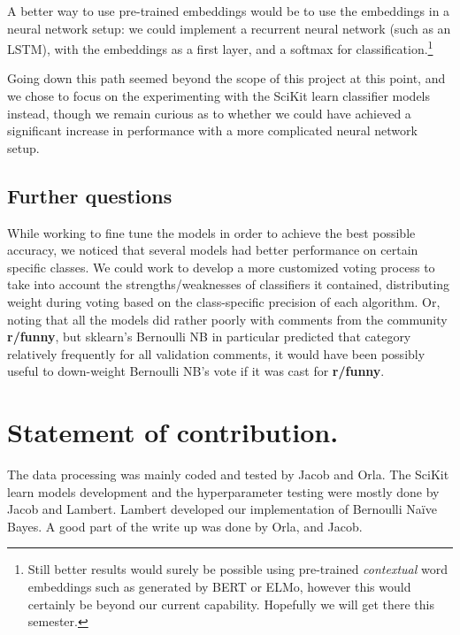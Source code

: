 \documentclass[letterpaper, 11pt]{article}
\begin{document}
A better way to use pre-trained embeddings would be to use the embeddings in a neural network setup: we could implement a recurrent neural network (such as an LSTM), with the embeddings as a first layer, and a softmax for classification.\footnote{Still better results would surely be possible using pre-trained \textit{contextual} word embeddings such as generated by BERT\cite{devlin2018bert} or ELMo\cite{Peters:2018}, however this would certainly be beyond our current capability. Hopefully we will get there this semester.}

Going down this path seemed beyond the scope of this project at this point, and we chose to focus on the experimenting with the SciKit learn classifier models instead, though we remain curious as to whether we could have achieved a significant increase in performance with a more complicated neural network setup.

\subsection{Further questions}

While working to fine tune the models in order to achieve the best possible accuracy, we noticed that several models had better performance on certain specific classes. We could work to develop a more customized voting process to take into account the strengths/weaknesses of classifiers it contained, distributing weight during voting based on the class-specific precision of each algorithm. Or, noting  that all the models did rather poorly with comments from the community \textbf{r/funny}, but sklearn's Bernoulli NB in particular predicted that category relatively frequently for all validation comments, it would have been possibly useful to down-weight Bernoulli NB's vote if it was cast for \textbf{r/funny}.

\section{Statement of contribution.}

The data processing was mainly coded and tested by Jacob and Orla. The SciKit learn models development and the hyperparameter testing were mostly done by Jacob and Lambert. Lambert developed our implementation of Bernoulli Na\"ive Bayes. A good part of the write up was done by Orla, and Jacob. 



\nocite{*}
\clearpage
\end{document}
